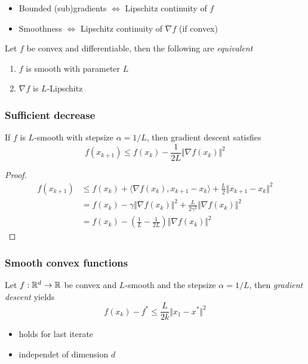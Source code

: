 \documentclass{beamer}
\begin{document}
\begin{frame}
  \frametitle{}
  \begin{itemize}
    \item Bounded (sub)gradients $\Leftrightarrow$ Lipschitz continuity of $f$
    \item Smoothness $\Leftrightarrow$ Lipschitz continuity of $\nabla f$ (if convex)
  \end{itemize}

  \begin{lemma}%
    Let $f$ be convex and differentiable, then the following are \textit{equivalent}
    \begin{enumerate}
      \item $f$ is smooth with parameter $L$
      \item $\nabla f$ is $L$-Lipschitz
    \end{enumerate}
  \end{lemma}
\end{frame}


\begin{frame}
  \frametitle{Sufficient decrease}
  \begin{lemma}%
    If $f$ is $L$-smooth with stepsize $\alpha = 1/L$, then gradient descent satisfies
    \begin{equation}
      f(x_{k+1}) \le f(x_k) - \frac{1}{2L} \Vert \nabla f(x_k) \Vert^2
    \end{equation}
  \end{lemma}
  \begin{proof}
    \begin{equation}
      \begin{aligned}
        f(x_{k+1}) &\le f(x_k) + \langle \nabla f(x_k), x_{k+1}-x_k \rangle + \frac{L}{2}\Vert x_{k+1}-x_k \Vert^2 \\
        &= f(x_k) - \gamma \Vert \nabla f(x_k) \Vert^2 + \frac{L}{2 \gamma^2} \Vert \nabla f(x_k) \Vert^2 \\
        &= f(x_k) - \left(\frac{1}{L} - \frac{1}{2L}\right) \Vert \nabla f(x_k) \Vert^2
      \end{aligned}
    \end{equation}
  \end{proof}
\end{frame}


\begin{frame}
  \frametitle{Smooth convex functions}
  \begin{theorem}
    Let $f: \mathbb{R}^d \to \mathbb{R}$ be convex and $L$-smooth and the stepsize $\alpha=1/L$, then
    \emph{gradient descent} yields
    \begin{equation}
      f(x_k)-f^* \le \frac{L}{2k}\Vert x_1-x^* \Vert^2
    \end{equation}
  \end{theorem}
  \begin{itemize}
    \item holds for last iterate
    \item independet of dimension $d$
  \end{itemize}
\end{frame}
\end{document}
